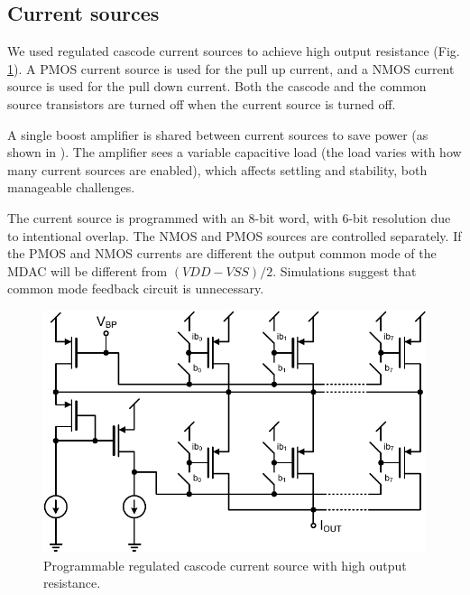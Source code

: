 






\subsection{Current sources}
We used regulated cascode current sources to achieve high output
resistance
(Fig. \ref{cbscfig:current}). A PMOS current source is used for the pull
up current, and a NMOS current source is used for the pull down
current. Both the cascode and the common source transistors are turned
off when the current source is turned off.

 A single boost amplifier is
shared between current sources to save power (as shown in ). The amplifier sees a variable
capacitive load (the load varies with how many current sources are
enabled), which affects settling and stability, both manageable
challenges.

 The 
current source is programmed with an 8-bit word, with
6-bit resolution due to intentional overlap. The NMOS and
PMOS sources are controlled separately. If the PMOS and NMOS currents
are different the output common mode of the MDAC will be different
from $(VDD-VSS)/2$. Simulations suggest that common
mode feedback circuit is unnecessary. 

\begin{figure}[htbp]
\centerline{ \includegraphics[width=\myfigwidth]{graphics/current}}
  \caption{Programmable regulated cascode current source with high output resistance.}
  \label{cbscfig:current}
\end{figure}


